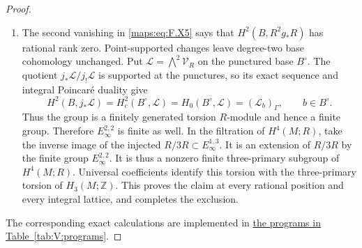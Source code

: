 \documentclass[11pt,a4paper]{article}
\numberwithin{equation}{section}
\theoremstyle{definition}
\begin{document}
\begin{proof}
\begin{enumerate}[label=\arabic*.]
\item The second vanishing in \eqref{maps:eq:F.X5} says
that $H^2(B,R^2g_*R)$ has rational rank zero.
Point-supported changes leave degree-two base cohomology
unchanged. Put $\mathcal L=\bigwedge^2\mathcal V_R$ on the
punctured base $B^\circ$. The quotient $j_*\mathcal L/j_!\mathcal L$
is supported at the punctures, so its exact sequence and integral
Poincar\'e duality give
\[
 H^2(B,j_*\mathcal L)=H_c^2(B^\circ,\mathcal L)
 =H_0(B^\circ,\mathcal L)=(\mathcal L_b)_\Gamma,
 \qquad b\in B^\circ.
\]
Thus the group is a finitely generated torsion $R$-module and
hence a finite group.  Therefore
$E_\infty^{2,2}$ is finite as well.  In the filtration
of $H^4(M;R)$, take the inverse image of the injected
$R/3R\subset E_\infty^{1,3}$.  It is an extension
of $R/3R$ by the finite group $E_\infty^{2,2}$.
It is thus a nonzero finite three-primary subgroup
of $H^4(M;R)$.
Universal coefficients identify this torsion with
the three-primary torsion of $H_3(M;\mathbb Z)$.
This proves the claim at every rational position and
every integral lattice, and completes the exclusion.

\end{enumerate}
The corresponding exact calculations are implemented in \hyperlink{prog:V:middle-pairing}{the programs in Table~\ref*{tab:V:programs}}.
\end{proof}
\end{document}
